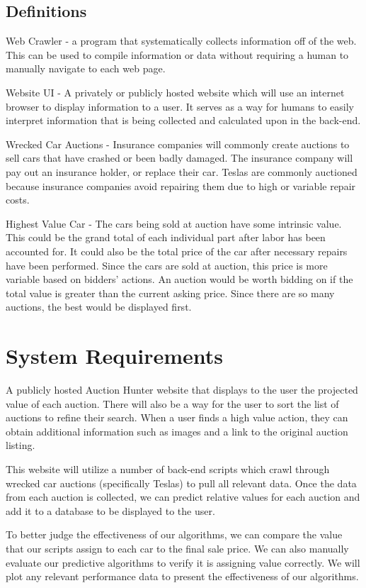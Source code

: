\documentclass[draftclsnofoot,onecolumn,10pt]{IEEEtran}
\begin{document}
\subsection{Definitions}
Web Crawler - a program that systematically collects information off of the web. This can be used to compile information or data without requiring a human to manually navigate to each web page. 

Website UI - A privately or publicly hosted website which will use an internet browser to display information to a user. It serves as a way for humans to easily interpret information that is being collected and calculated upon in the back-end. 

Wrecked Car Auctions - Insurance companies will commonly create auctions to sell cars that have crashed or been badly damaged. The insurance company will pay out an insurance holder, or replace their car. Teslas are commonly auctioned because insurance companies avoid repairing them due to high or variable repair costs. 

Highest Value Car - The cars being sold at auction have some intrinsic value. This could be the grand total of each individual part after labor has been accounted for. It could also be the total price of the car after necessary repairs have been performed. Since the cars are sold at auction, this price is more variable based on bidders' actions. An auction would be worth bidding on if the total value is greater than the current asking price. Since there are so many auctions, the best would be displayed first. 

\section{System Requirements}
A publicly hosted Auction Hunter website that displays to the user the projected value of each auction. There will also be a way for the user to sort the list of auctions to refine their search. When a user finds a high value action, they can obtain additional information such as images and a link to the original auction listing. 

This website will utilize a number of back-end scripts which crawl through wrecked car auctions (specifically Teslas) to pull all relevant data. Once the data from each auction is collected, we can predict relative values for each auction and add it to a database to be displayed to the user. 

To better judge the effectiveness of our algorithms, we can compare the value that our scripts assign to each car to the final sale price. We can also manually evaluate our predictive algorithms to verify it is assigning value correctly. We will plot any relevant performance data to present the effectiveness of our algorithms.  
\end{document}

